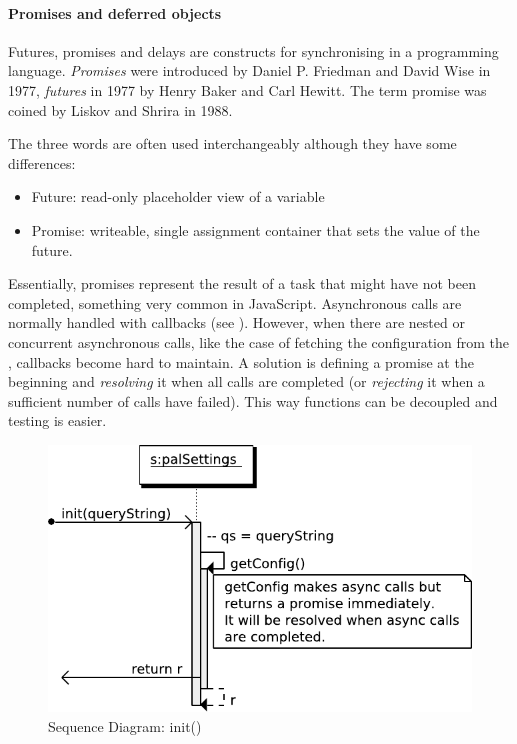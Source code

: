 \paragraph{Promises and deferred objects} Futures, promises and delays are constructs for synchronising in a programming language.
\textit{Promises} were introduced by Daniel P. Friedman and David Wise in 1977, \textit{futures} in 1977 by Henry Baker and Carl Hewitt.
The term promise was coined by Liskov and Shrira \cite{Liskov:1988} in 1988.

The three words are often used interchangeably although they have some differences:
\begin{itemize}
\item Future: read-only placeholder view of a variable
\item Promise: writeable, single assignment container that sets the value of the future.
\end{itemize}
Essentially, promises represent the result of a task that might have not been completed, something very common in JavaScript.
Asynchronous calls are normally handled with callbacks (see ).
However, when there are nested or concurrent asynchronous calls, like the case of fetching the configuration from the \flangobe , callbacks become hard to maintain.
A solution is defining a promise at the beginning and \emph{resolving} it when all calls are completed (or \emph{rejecting} it when a sufficient number of calls have failed).
This way functions can be decoupled and testing is easier. 

\begin{figure}[htb]
    \centering
    \includegraphics{figures/design/seqdia/palSettings-init.pdf}
    \caption{Sequence Diagram: init()}
    \label{fig:design-seqdia-palSettings-init}
\end{figure}

